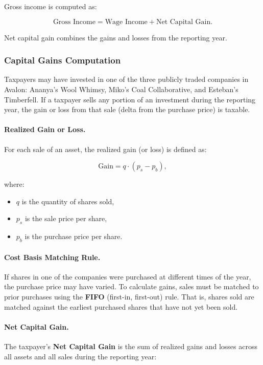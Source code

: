 Gross income is computed as:

\[
\text{Gross Income} = \text{Wage Income} + \text{Net Capital Gain}.
\]

Net capital gain combines the gains and losses from the reporting year.

\subsubsection{Capital Gains Computation}

Taxpayers may have invested in one of the three publicly traded companies in Avalon: Ananya's Wool Whimsy, Miko's Coal Collaborative, and Esteban's Timberfell.
If a taxpayer sells any portion of an investment during the reporting year, the gain or loss from that sale (delta from the purchase price) is taxable.

\paragraph{Realized Gain or Loss.}

For each sale of an asset, the realized gain (or loss) is defined as:

\[
\text{Gain} = q \cdot (p_s - p_b),
\]

where:
\begin{itemize}
  \item $q$ is the quantity of shares sold,
  \item $p_s$ is the sale price per share,
  \item $p_b$ is the purchase price per share.
\end{itemize}

\paragraph{Cost Basis Matching Rule.}

If shares in one of the companies were purchased at different times of the year, the purchase price may have varied.
To calculate gains, sales must be matched to prior purchases using the \textbf{FIFO} (first-in, first-out) rule.
That is, shares sold are matched against the earliest purchased shares that have not yet been sold.

\paragraph{Net Capital Gain.}

The taxpayer’s \textbf{Net Capital Gain} is the sum of realized gains and losses across all assets and all sales during the reporting year:

